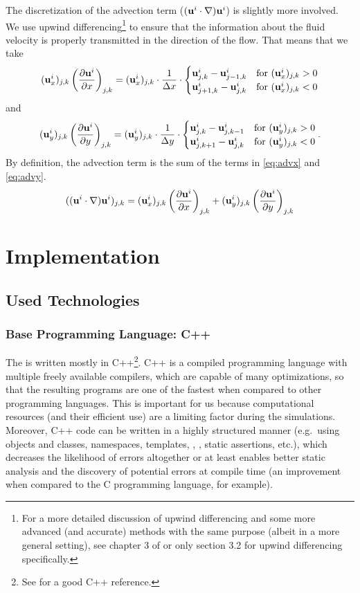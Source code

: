 \documentclass[11pt,a4paper,twoside,openright]{report}
\begin{document}
The discretization of the advection term ($(\mathbf u^i\cdot\nabla)\mathbf u^i$) is slightly more involved. We use upwind diffe\-rencing\footnote{For a more detailed discussion of upwind differencing and some more advanced (and accurate) methods with the same purpose (albeit in a more general setting), see chapter 3 of \cite{OsherFedkiw} or only section 3.2 for upwind differencing specifically.} to ensure that the information about the fluid velocity is properly transmitted in the direction of the flow. That means that we take
\begin{align}\label{eq:advx}
	(\mathbf u^i_x)_{j,k}\left(\frac{\partial \mathbf u^i}{\partial x}\right)_{j,k}=(\mathbf u^i_x)_{j,k}\cdot\frac1{\Delta x}\cdot\begin{cases}
		\mathbf u^i_{j,k}-\mathbf u^i_{j-1,k} & \text{for }(\mathbf u^i_x)_{j,k}>0\\
		\mathbf u^i_{j+1,k}-\mathbf u^i_{j,k} & \text{for }(\mathbf u^i_x)_{j,k}<0
	\end{cases}
\end{align}
and
\begin{align}\label{eq:advy}
	(\mathbf u^i_y)_{j,k}\left(\frac{\partial \mathbf u^i}{\partial y}\right)_{j,k}=(\mathbf u^i_y)_{j,k}\cdot\frac1{\Delta y}\cdot\begin{cases}
		\mathbf u^i_{j,k}-\mathbf u^i_{j,k-1} & \text{for }(\mathbf u^i_y)_{j,k}>0\\
		\mathbf u^i_{j,k+1}-\mathbf u^i_{j,k} & \text{for }(\mathbf u^i_y)_{j,k}<0
	\end{cases}.
\end{align}
By definition, the advection term is the sum of the terms in \eqref{eq:advx} and \eqref{eq:advy}.
\begin{align*}
	((\mathbf u^i\cdot\nabla)\mathbf u^i)_{j,k}=(\mathbf u^i_x)_{j,k}\left(\frac{\partial \mathbf u^i}{\partial x}\right)_{j,k}+(\mathbf u^i_y)_{j,k}\left(\frac{\partial \mathbf u^i}{\partial y}\right)_{j,k}
\end{align*}

\chapter{Implementation}

\section{Used Technologies}
\subsection{Base Programming Language: C++}
The \software{} is written mostly in C++\footnote{See \cite{cppreference} for a good C++ reference.}. C++ is a compiled programming language with multiple freely available compilers, which are capable of many optimizations, so that the resulting programs are one of the fastest when compared to other programming languages. This is important for us because computational resources (and their efficient use) are a limiting factor during the simulations. Moreover, C++ code can be written in a highly structured manner (e.g.\ using objects and classes, namespaces, templates, , , static assertions, etc.), which decreases the likelihood of errors altogether or at least enables better static analysis and the discovery of potential errors at compile time (an improvement when compared to the C programming language, for example). 
\end{document}
